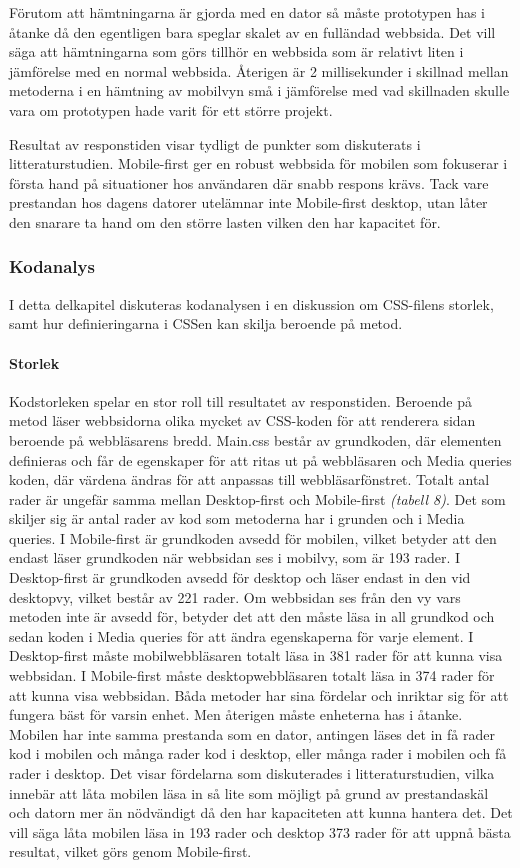 \documentclass[11pt]{article}
\begin{document}
Förutom att hämtningarna är gjorda med en dator så måste prototypen has i åtanke då den egentligen bara speglar skalet av en fulländad webbsida. Det vill säga att hämtningarna som görs tillhör en webbsida som är relativt liten i jämförelse med en normal webbsida. Återigen är 2 millisekunder i skillnad mellan metoderna i en hämtning av mobilvyn små i jämförelse med vad skillnaden skulle vara om prototypen hade varit för ett större projekt.

Resultat av responstiden visar tydligt de punkter som diskuterats i litteraturstudien. Mobile-first ger en robust webbsida för mobilen som fokuserar i första hand på situationer hos användaren där snabb respons krävs. Tack vare prestandan hos dagens datorer utelämnar inte Mobile-first desktop, utan låter den snarare ta hand om den större lasten vilken den har kapacitet för.

\subsubsection{Kodanalys}
I detta delkapitel diskuteras kodanalysen i en diskussion om CSS-filens storlek, samt hur definieringarna i CSSen kan skilja beroende på metod.
\paragraph{Storlek}\mbox{}

Kodstorleken spelar en stor roll till resultatet av responstiden. Beroende på metod läser webbsidorna olika mycket av CSS-koden för att renderera sidan beroende på webbläsarens bredd. Main.css består av grundkoden, där elementen definieras och får de egenskaper för att ritas ut på webbläsaren och Media queries koden, där värdena ändras för att anpassas till webbläsarfönstret. Totalt antal rader är ungefär samma mellan Desktop-first och Mobile-first \textit{(tabell 8)}. Det som skiljer sig är antal rader av kod som metoderna har i grunden och i Media queries. I Mobile-first är grundkoden avsedd för mobilen, vilket betyder att den endast läser grundkoden när webbsidan ses i mobilvy, som är 193 rader. I Desktop-first är grundkoden avsedd för desktop och läser endast in den vid desktopvy, vilket består av 221 rader. Om webbsidan ses från den vy vars metoden inte är avsedd för, betyder det att den måste läsa in all grundkod och sedan koden i Media queries för att ändra egenskaperna för varje element. I Desktop-first måste mobilwebbläsaren totalt läsa in 381 rader för att kunna visa webbsidan. I Mobile-first måste desktopwebbläsaren totalt läsa in 374 rader för att kunna visa webbsidan. Båda metoder har sina fördelar och inriktar sig för att fungera bäst för varsin enhet. Men återigen måste enheterna has i åtanke. Mobilen har inte samma prestanda som en dator, antingen läses det in få rader kod i mobilen och många rader kod i desktop, eller många rader i mobilen och få rader i desktop. Det visar fördelarna som diskuterades i litteraturstudien, vilka innebär att låta mobilen läsa in så lite som möjligt på grund av prestandaskäl och datorn mer än nödvändigt då den har kapaciteten att kunna hantera det. Det vill säga låta mobilen läsa in 193 rader och desktop 373 rader för att uppnå bästa resultat, vilket görs genom Mobile-first.
\end{document}
